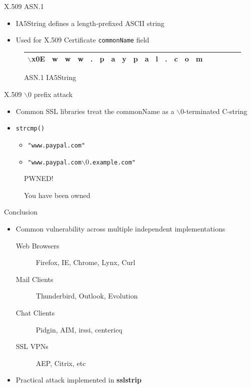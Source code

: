 \documentclass{beamer}
\begin{document}
\begin{frame}{X.509 ASN.1}
  \begin{itemize}
    \item IA5String defines a length-prefixed ASCII string
    \item Used for X.509 Certificate \texttt{commonName} field
  \end{itemize}
  \begin{figure}
    \begin{tabular}{*{20}{|c}}
      \hline
      $\backslash$x0E & w & w & w & . & p & a & y & p & a & l & . & c & o & m \\
      \hline 
    \end{tabular}
    \caption{ASN.1 IA5String}
  \end{figure}
\end{frame}

\begin{frame}{X.509 $\backslash0$ prefix attack}
  \begin{itemize}
    \item Common SSL libraries treat the commonName as a $\backslash0$-terminated C-string
    \item \texttt{strcmp()}
      \begin{itemize}
        \item \texttt{"www.paypal.com"}  
        \item \texttt{"www.paypal.com$\backslash0$.example.com"}
      \end{itemize} 
  \end{itemize}
  \pause
  \begin{figure}
    \centering
      {\Huge{PWNED!}}
    \caption{You have been owned}
  \end{figure}
\end{frame}

\begin{frame}[fragile]{Conclusion}
  \begin{itemize}
    \item Common vulnerability across multiple independent implementations
    \begin{description}
      \item[Web Browsers] Firefox, IE, Chrome, Lynx, Curl
      \item[Mail Clients] Thunderbird, Outlook, Evolution
      \item[Chat Clients] Pidgin, AIM, irssi, centericq
      \item[SSL VPNs] AEP, Citrix, etc
    \end{description}
    \item Practical attack implemented in \textbf{sslstrip}
  \end{itemize}
\end{frame}
\end{document}
